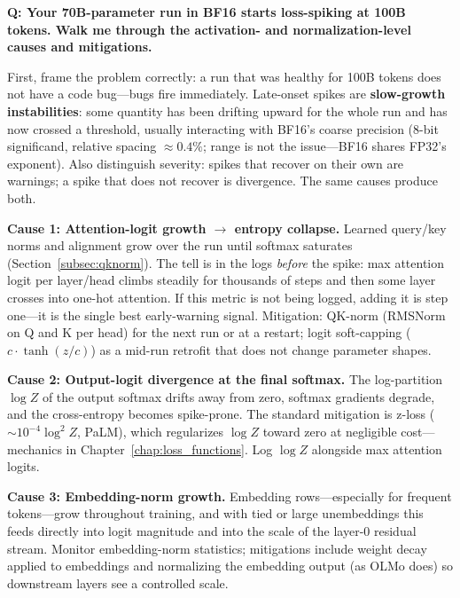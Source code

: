 
\begin{interviewq}
\textbf{Q: Your 70B-parameter run in BF16 starts loss-spiking at 100B tokens. Walk me through the activation- and normalization-level causes and mitigations.}

  \quad {} \quad \badgefreq{\freqhigh}

\stronganswer

First, frame the problem correctly: a run that was healthy for 100B tokens does not have a code bug---bugs fire immediately. Late-onset spikes are \textbf{slow-growth instabilities}: some quantity has been drifting upward for the whole run and has now crossed a threshold, usually interacting with BF16's coarse precision (8-bit significand, relative spacing $\approx 0.4\%$; range is not the issue---BF16 shares FP32's exponent). Also distinguish severity: spikes that recover on their own are warnings; a spike that does not recover is divergence. The same causes produce both.

\textbf{Cause 1: Attention-logit growth $\to$ entropy collapse.} Learned query/key norms and alignment grow over the run until softmax saturates (Section~\ref{subsec:qknorm}). The tell is in the logs \textit{before} the spike: max attention logit per layer/head climbs steadily for thousands of steps and then some layer crosses into one-hot attention. If this metric is not being logged, adding it is step one---it is the single best early-warning signal. Mitigation: QK-norm (RMSNorm on Q and K per head) for the next run or at a restart; logit soft-capping ($c\cdot\tanh(z/c)$) as a mid-run retrofit that does not change parameter shapes.

\textbf{Cause 2: Output-logit divergence at the final softmax.} The log-partition $\log Z$ of the output softmax drifts away from zero, softmax gradients degrade, and the cross-entropy becomes spike-prone. The standard mitigation is z-loss ($\sim 10^{-4}\log^2 Z$, PaLM), which regularizes $\log Z$ toward zero at negligible cost---mechanics in Chapter~\ref{chap:loss_functions}. Log $\log Z$ alongside max attention logits.

\textbf{Cause 3: Embedding-norm growth.} Embedding rows---especially for frequent tokens---grow throughout training, and with tied or large unembeddings this feeds directly into logit magnitude and into the scale of the layer-0 residual stream. Monitor embedding-norm statistics; mitigations include weight decay applied to embeddings and normalizing the embedding output (as OLMo does) so downstream layers see a controlled scale.


\end{interviewq}
